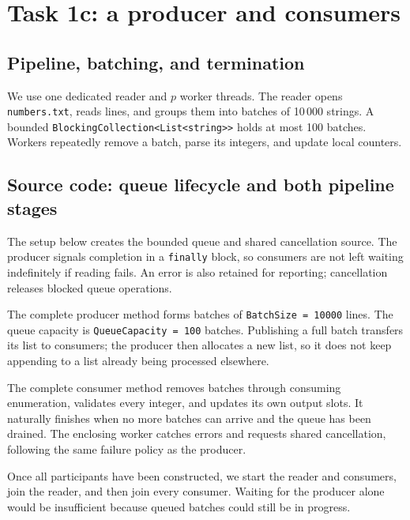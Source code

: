\chapter{Task 1c: a producer and consumers}
\section{Pipeline, batching, and termination}
We use one dedicated reader and \(p\) worker threads. The reader opens \texttt{numbers.txt}, reads lines, and groups them into batches of 10\,000 strings. A bounded \texttt{BlockingCollection<List<string>>} holds at most 100 batches. Workers repeatedly remove a batch, parse its integers, and update local counters.

\section{Source code: queue lifecycle and both pipeline stages}
The setup below creates the bounded queue and shared cancellation source. The producer signals completion in a \texttt{finally} block, so consumers are not left waiting indefinitely if reading fails. An error is also retained for reporting; cancellation releases blocked queue operations.


The complete producer method forms batches of \texttt{BatchSize = 10000} lines. The queue capacity is \texttt{QueueCapacity = 100} batches. Publishing a full batch transfers its list to consumers; the producer then allocates a new list, so it does not keep appending to a list already being processed elsewhere.


The complete consumer method removes batches through consuming enumeration, validates every integer, and updates its own output slots. It naturally finishes when no more batches can arrive and the queue has been drained. The enclosing worker catches errors and requests shared cancellation, following the same failure policy as the producer.


Once all participants have been constructed, we start the reader and consumers, join the reader, and then join every consumer. Waiting for the producer alone would be insufficient because queued batches could still be in progress.

